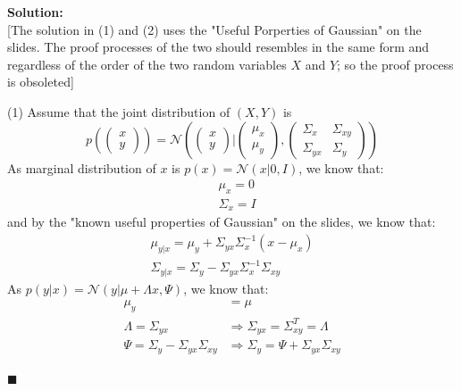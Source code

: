 \documentclass{article}
\newenvironment{solution}                               %
{\textbf{Solution:} \\}{$\blacksquare$\newline}         %
\newcommand{\leadto}{\Rightarrow}                       %
\newcommand{\Gaussian}{\mathcal{N}}                     %
\newcommand{\IdenMat}{\textit{I}}                       %
\begin{document}
    \begin{solution}
        {[}The solution in (1) and (2) uses the "Useful Porperties of Gaussian" on the slides. The proof processes of the two should resembles in the same form and regardless of the order of the two random variables $X$ and $Y$; so the proof process is obsoleted{]}

        (1) Assume that the joint distribution of $(X, Y)$ is
        $$
        p(\begin{pmatrix}
            x \\ y
        \end{pmatrix}) = 
        \Gaussian(
            \begin{pmatrix}
                x \\ y
            \end{pmatrix}
            | 
            \begin{pmatrix}
                \mu_x \\ \mu_y
            \end{pmatrix}, 
            \begin{pmatrix}
                \Sigma_{x} & \Sigma_{xy} \\
                \Sigma_{yx} & \Sigma_{y}
            \end{pmatrix}
        )
        $$
        As marginal distribution of $x$ is $p(x) = \Gaussian(x | 0, \IdenMat)$, we know that: 
        \begin{align*}
            & \mu_x = 0 \\
            & \Sigma_{x} = \IdenMat
        \end{align*}
        and by the "known useful properties of Gaussian" on the slides, we know that:
        \begin{align*}
            \mu_{y|x} = \mu_y + \Sigma_{yx} \Sigma_{x}^{-1}(x - \mu_x) \\
            \Sigma_{y|x} = \Sigma_{y} - \Sigma_{yx} \Sigma_{x}^{-1} \Sigma_{xy}
        \end{align*}
        As $p(y|x) = \Gaussian(y | \mu+\Lambda x, \Psi)$, we know that:
        \begin{align*}
            \mu_y &= \mu \\
            \Lambda = \Sigma_{yx} 
                &\leadto \Sigma_{yx}=\Sigma_{xy}^T=\Lambda\\
            \Psi = \Sigma_{y} - \Sigma_{yx} \Sigma_{xy}
                &\leadto \Sigma_{y} = \Psi + \Sigma_{yx} \Sigma_{xy}
        \end{align*}

\end{solution}
\end{document}

